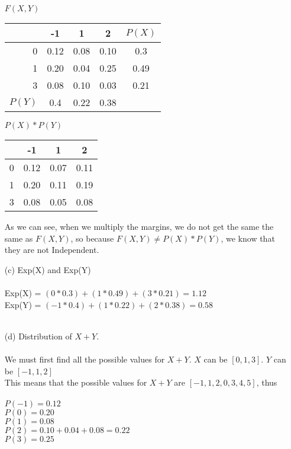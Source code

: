 \documentclass[11pt]{article}
\begin{document}
\begin{enumerate}
\begin{center}
{\Large \textbf{$F(X, Y)$}}\\ 
  \begin{tabular}{ r || c | c | c || c |}
	 & -1 & 1 & 2 & $P(X)$\\ \hline
	 0 & 0.12 & 0.08 & 0.10 & 0.3 \\ \hline   
    1 & 0.20 & 0.04 & 0.25 & 0.49\\ \hline
    3 & 0.08 & 0.10 & 0.03 & 0.21\\ \hline \hline
	$P(Y)$ & 0.4 & 0.22 & 0.38
  \end{tabular}
\end{center}
\begin{center}
{\Large \textbf{$P(X) * P(Y)$}}\\ 
  \begin{tabular}{ r || c | c | c |}
	 & -1 & 1 & 2 \\ \hline
	 0 & 0.12 & 0.07 & 0.11\\ \hline   
    1 & 0.20 & 0.11 & 0.19 \\ \hline
    3 & 0.08 & 0.05 & 0.08 \\ \hline
    \hline
  \end{tabular}
\end{center}
As we can see, when we multiply the margins, we do not get the same the same as $F(X,Y)$, so because $F(X, Y) \neq P(X) * P(Y)$, we know that they are not Independent.
\item[(c)] Exp(X) and Exp(Y)\\
\\
{\Large Exp(X) = $(0 * 0.3) + (1 * 0.49) + (3 * 0.21) = 1.12$}\\
{\Large Exp(Y) = $(-1 * 0.4) + (1 * 0.22) + (2 * 0.38) = 0.58$}\\
\\
\item[(d)] Distribution of $X + Y$. \\ \\
We must first find all the possible values for $X + Y$.  $X$ can be $[0, 1, 3]$.  $Y$ can be $[-1, 1, 2]$\\
This means that the possible values for $X + Y$ are $[-1, 1, 2, 0, 3, 4, 5]$, thus
\\\\
$P(-1) = 0.12$\\
$P(0) = 0.20$\\
$P(1) = 0.08$ \\
$P(2) = 0.10 + 0.04 + 0.08 = 0.22$\\
$P(3) = 0.25$\\

\end{enumerate}
\end{document}

